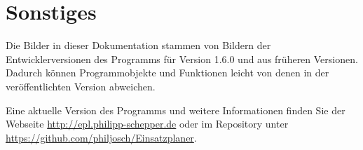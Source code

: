\chapter{Sonstiges}\label{sonstiges}
Die Bilder in dieser Dokumentation stammen von Bildern der Entwicklerversionen des Programms für Version 1.6.0 und aus früheren Versionen.
Dadurch können Programmobjekte und Funktionen leicht von denen in der veröffentlichten Version abweichen.

Eine aktuelle Version des Programms und weitere Informationen finden Sie der Webseite \url{http://epl.philipp-schepper.de}
oder im Repository unter \url{https://github.com/philjosch/Einsatzplaner}.
